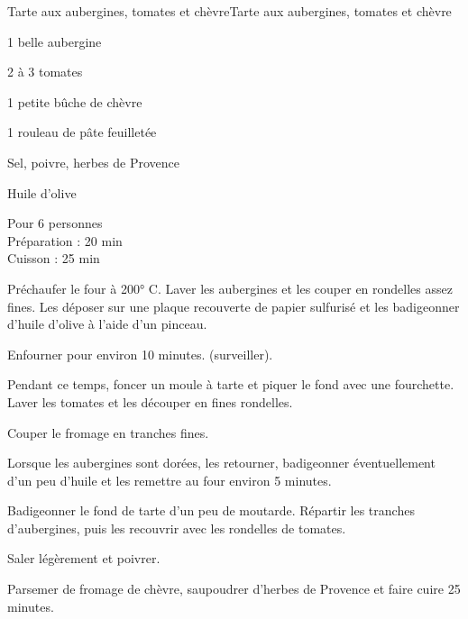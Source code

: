 \begin{recette}{Tarte aux aubergines, tomates et chèvre}{Tarte aux aubergines, tomates et chèvre}

\begin{ingredients}
1 belle aubergine\par
2 à 3 tomates\par
1 petite bûche de chèvre\par
1 rouleau de pâte feuilletée\par
Sel, poivre, herbes de Provence\par
Huile d'olive\par
\end{ingredients}

\begin{infos}
Pour 6 personnes\\
Préparation : 20 min\\
Cuisson : 25 min\\
\end{infos}

\begin{etapes}
\item Préchaufer le four à 200° C. Laver les aubergines et les couper en rondelles assez fines. Les déposer sur une plaque recouverte de papier sulfurisé et les badigeonner d'huile d'olive à l'aide d'un pinceau.
\item Enfourner pour environ 10 minutes. (surveiller).
\item Pendant ce temps, foncer un moule à tarte et piquer le fond avec une fourchette. Laver les tomates et les découper en fines rondelles.
\item Couper le fromage en tranches fines.
\item Lorsque les aubergines sont dorées, les retourner, badigeonner éventuellement d'un peu d'huile et les remettre au four environ 5 minutes.
\item Badigeonner le fond de tarte d'un peu de moutarde. Répartir les tranches d'aubergines, puis les recouvrir avec les rondelles de tomates.
\item Saler légèrement et poivrer.
\item Parsemer de fromage de chèvre, saupoudrer d'herbes de Provence et faire cuire 25 minutes.
\end{etapes}

\end{recette}